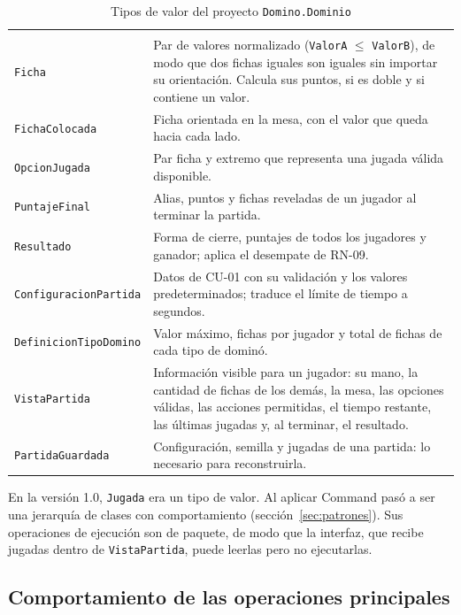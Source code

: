 {\tablacompacta
\begin{longtable}{@{}L{4.4cm}L{10.1cm}@{}}
  \caption{Tipos de valor del proyecto \texttt{Domino.Dominio}}\label{tab:tipos-dato}\\
  \toprule
   &  \\ \midrule \endfirsthead
  \toprule
   &  \\ \midrule \endhead
  \bottomrule \endlastfoot
  \texttt{Ficha} & Par de valores normalizado (\texttt{ValorA} $\leq$ \texttt{ValorB}), de modo que dos fichas iguales son iguales sin importar su orientación. Calcula sus puntos, si es doble y si contiene un valor. \\ \filasep
  \texttt{FichaColocada} & Ficha orientada en la mesa, con el valor que queda hacia cada lado. \\ \filasep
  \texttt{OpcionJugada} & Par ficha y extremo que representa una jugada válida disponible. \\ \filasep
  \texttt{PuntajeFinal} & Alias, puntos y fichas reveladas de un jugador al terminar la partida. \\ \filasep
  \texttt{Resultado} & Forma de cierre, puntajes de todos los jugadores y ganador; aplica el desempate de RN-09. \\ \filasep
  \texttt{ConfiguracionPartida} & Datos de CU-01 con su validación y los valores predeterminados; traduce el límite de tiempo a segundos. \\ \filasep
  \texttt{DefinicionTipoDomino} & Valor máximo, fichas por jugador y total de fichas de cada tipo de dominó. \\ \filasep
  \texttt{VistaPartida} & Información visible para un jugador: su mano, la cantidad de fichas de los demás, la mesa, las opciones válidas, las acciones permitidas, el tiempo restante, las últimas jugadas y, al terminar, el resultado. \\ \filasep
  \texttt{PartidaGuardada} & Configuración, semilla y jugadas de una partida: lo necesario para reconstruirla. \\
\end{longtable}}

En la versión 1.0, \texttt{Jugada} era un tipo de valor. Al aplicar Command pasó a ser una jerarquía de clases con comportamiento (sección~\ref{sec:patrones}). Sus operaciones de ejecución son de paquete, de modo que la interfaz, que recibe jugadas dentro de \texttt{VistaPartida}, puede leerlas pero no ejecutarlas.

\subsection{Comportamiento de las operaciones principales}

